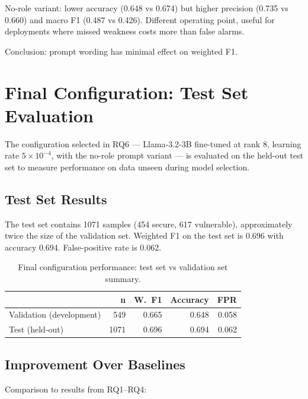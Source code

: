 No-role variant: lower accuracy (0.648 vs 0.674) but higher precision (0.735 vs 0.660) and macro F1 (0.487 vs 0.426). Different operating point, useful for deployments where missed weakness costs more than false alarms.

Conclusion: prompt wording has minimal effect on weighted F1.

\section{Final Configuration: Test Set Evaluation}

The configuration selected in RQ6 --- Llama-3.2-3B fine-tuned at rank 8, learning rate $5\times10^{-4}$, with the no-role prompt variant --- is evaluated on the held-out test set to measure performance on data unseen during model selection.

\subsection{Test Set Results}

The test set contains 1071 samples (454 secure, 617 vulnerable), approximately twice the size of the validation set. Weighted F1 on the test set is 0.696 with accuracy 0.694. False-positive rate is 0.062.

\begin{table}[H]
\centering
\caption{Final configuration performance: test set vs validation set summary.}
\label{tab:final_test}
\footnotesize
\begin{tabular}{l r r r r}
\toprule
\textbf{} & \textbf{n} & \textbf{W.\ F1} & \textbf{Accuracy} & \textbf{FPR} \\
\midrule
Validation (development) & 549 & 0.665 & 0.648 & 0.058 \\
Test (held-out) & 1071 & 0.696 & 0.694 & 0.062 \\
\bottomrule
\end{tabular}
\end{table}

\subsection{Improvement Over Baselines}

Comparison to results from RQ1--RQ4:

